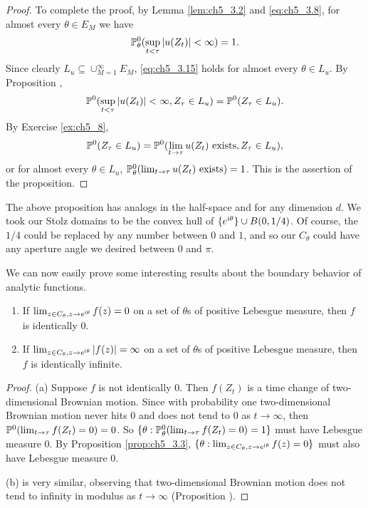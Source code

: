 \begin{proof}
To complete the proof, by Lemma \ref{lem:ch5_3.2} and \eqref{eq:ch5_3.8}, for almost every $\theta \in E_M$ we have
\begin{equation}\label{eq:ch5_3.15}
    \P_\theta^0(\sup_{t<\tau} |u(Z_t)| < \infty) = 1.
\end{equation}
Since clearly $L_u \subseteq \cup_{M=1}^\infty E_M$, \eqref{eq:ch5_3.15} holds for almost every $\theta \in L_u$. By Proposition ,
\[
    \P^0(\sup_{t<\tau}|u(Z_t)|<\infty, Z_{\tau}\in L_u)=\P^0(Z_{\tau}\in L_u).
\]
By Exercise \ref{ex:ch5_8},
\[
    \P^0(Z_\tau \in L_u) = \P^0(\lim_{t\to\tau} u(Z_t)~\text{exists}, Z_\tau \in L_u),
\]
or for almost every $\theta \in L_u$, $\P_\theta^0(\lim_{t\to\tau} u(Z_t)~\text{exists}) = 1$. This is the assertion of the proposition.
\end{proof}


The above proposition has analogs in the half-space and for any dimension $d$. We took our Stolz domains to be the convex hull of $\{e^{\im \theta}\} \cup B(0,1/4)$. Of course, the $1/4$ could be replaced by any number between $0$ and $1$, and so our $C_\theta$ could have any aperture angle we desired between $0$ and $\pi$.


We can now easily prove some interesting results about the boundary behavior of analytic functions.

\begin{theorem}\label{thm:ch5_3.4}
\begin{enumerate}[wide, labelindent=0em, labelwidth=\parindent, labelsep = 0em]
\item If $\lim_{z\in C_\theta,z\to e^{\im\theta}} f(z) = 0$ on a set of $\theta$s of positive Lebesgue measure, then $f$ is identically $0$.
\item If $\lim_{z\in C_\theta,z\to e^{\im\theta}} |f(z)| = \infty$ on a set of $\theta$s of positive Lebesgue measure, then $f$ is identically infinite.
\end{enumerate}
\end{theorem}

\begin{proof}
(a) Suppose $f$ is not identically $0$. Then $f(Z_t)$ is a time change of two-dimensional Brownian motion. Since with probability one two-dimensional Brownian motion never hits $0$ and does not tend to $0$ as $t \to \infty$, then $\P^0(\lim_{t\to\tau} f(Z_t) = 0) = 0$. So $\{\theta : \P_\theta^0(\lim_{t\to\tau} f(Z_t) = 0) = 1\}$ must have Lebesgue measure $0$. By Proposition \ref{prop:ch5_3.3}, $\{\theta : \lim_{z\in C_\theta,z\to e^{\im\theta}} f(z) = 0\}$ must also have Lebesgue measure $0$.

(b) is very similar, observing that two-dimensional Brownian motion does not tend to infinity in modulus as $t \to \infty$ (Proposition ).
\end{proof}

